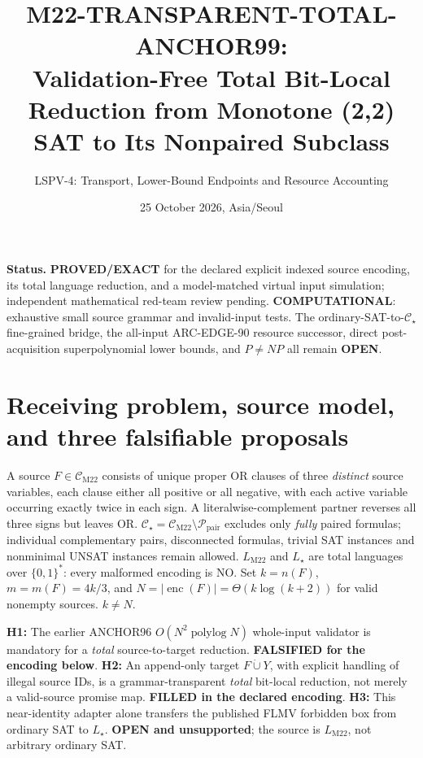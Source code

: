 \documentclass[11pt]{article}
\title{M22-TRANSPARENT-TOTAL-ANCHOR99:\\Validation-Free Total Bit-Local Reduction from Monotone (2,2) SAT to Its Nonpaired Subclass}
\author{LSPV-4: Transport, Lower-Bound Endpoints and Resource Accounting}
\date{25 October 2026, Asia/Seoul}
\newcommand{\CM}{\mathcal C_{\mathrm{M22}}}
\newcommand{\CS}{\mathcal C_\star}
\newcommand{\LM}{L_{\mathrm{M22}}}
\newcommand{\LS}{L_\star}
\begin{document}
\maketitle
\noindent\textbf{Status.} \textbf{PROVED/EXACT} for the declared explicit indexed source encoding, its total language reduction, and a model-matched virtual input simulation; independent mathematical red-team review pending. \textbf{COMPUTATIONAL}: exhaustive small source grammar and invalid-input tests. The ordinary-SAT-to-\(\CS\) fine-grained bridge, the all-input ARC-EDGE-90 resource successor, direct post-acquisition superpolynomial lower bounds, and \(P\ne NP\) all remain \textbf{OPEN}.

\section{Receiving problem, source model, and three falsifiable proposals}
A source \(F\in\CM\) consists of unique proper OR clauses of three \emph{distinct} source variables, each clause either all positive or all negative, with each active variable occurring exactly twice in each sign. A literalwise-complement partner reverses all three signs but leaves OR. \(\CS=\CM\setminus\mathcal P_{\mathrm{pair}}\) excludes only \emph{fully} paired formulas; individual complementary pairs, disconnected formulas, trivial SAT instances and nonminimal UNSAT instances remain allowed. \(\LM\) and \(\LS\) are total languages over \(\{0,1\}^*\): every malformed encoding is NO. Set \(k=n(F)\), \(m=m(F)=4k/3\), and \(N=|\operatorname{enc}(F)|=\Theta(k\log(k+2))\) for valid nonempty sources. \(k\ne N\).

\noindent\textbf{H1:} The earlier ANCHOR96 \(O(N^2\operatorname{polylog}N)\) whole-input validator is mandatory for a \emph{total} source-to-target reduction. \textbf{FALSIFIED for the encoding below}. \textbf{H2:} An append-only target \(F\dot\cup Y\), with explicit handling of illegal source IDs, is a grammar-transparent \emph{total} bit-local reduction, not merely a valid-source promise map. \textbf{FILLED in the declared encoding}. \textbf{H3:} This near-identity adapter alone transfers the published FLMV forbidden box from ordinary SAT to \(\LS\). \textbf{OPEN and unsupported}; the source is \(\LM\), not arbitrary ordinary SAT.
\end{document}
